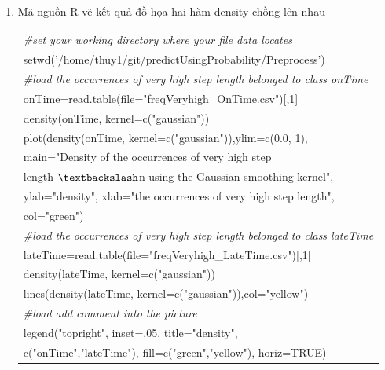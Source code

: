 \documentclass[a4paper, 13pt]{report}
\begin{document}
\begin{enumerate}[label=\textbf{PL\arabic*}]
\item Mã nguồn R vẽ kết quả đồ họa hai hàm density chồng lên nhau
\begin{flushleft}
\begin{tabular}{  |l| }
\hline 
\textit{\#set your working directory where your file data locates}\\
setwd('/home/thuy1/git/predictUsingProbability/Preprocess')\\
\textit{\#load the occurrences of very high step length belonged to class onTime}\\
onTime=read.table(file="freqVeryhigh\_OnTime.csv")[,1]\\
density(onTime, kernel=c("gaussian"))\\
plot(density(onTime, kernel=c("gaussian")),ylim=c(0.0, 1),\\
\hspace{.5cm} main="Density of the occurrences of very high step\\
\hspace{1.7cm} length $\textbackslash$n using the Gaussian smoothing kernel",\\
\hspace{.5cm}     ylab="density", xlab="the occurrences of very high step length",\\
\hspace{.5cm}     col="green")\\
\textit{\#load the occurrences of very high step length belonged to class lateTime}\\
lateTime=read.table(file="freqVeryhigh\_LateTime.csv")[,1]\\
density(lateTime, kernel=c("gaussian"))\\
lines(density(lateTime, kernel=c("gaussian")),col="yellow")\\
\textit{\#load add comment into the picture}\\
legend("topright", inset=.05, title="density",\\
\hspace{.7cm} c("onTime","lateTime"), fill=c("green","yellow"), horiz=TRUE)\\
\hline
\end{tabular}
\end{flushleft}


\end{enumerate}
\end{document}
